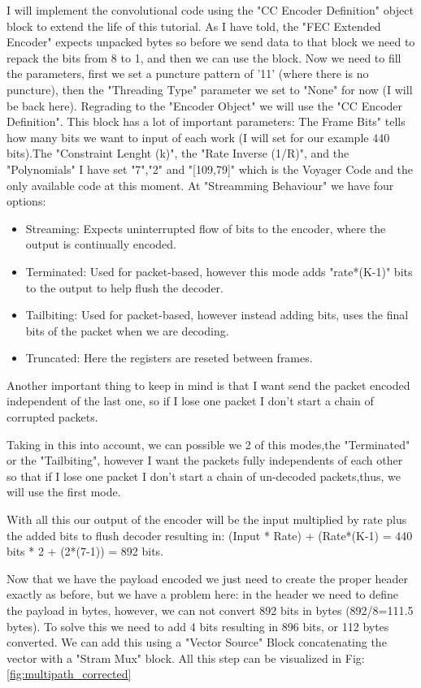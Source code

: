 \documentclass[a4paper, 10pt, conference]{ieeeconf}      %
\begin{document}
    I will implement the convolutional code using the "CC Encoder Definition" object block to extend the life of this tutorial. As I have told, the "FEC Extended Encoder" expects unpacked bytes so before we send data to that block we need to repack the bits from 8 to 1, and then we can use the block. Now we need to fill the parameters, first we set a puncture pattern of '11' (where there is no puncture), then the "Threading Type" parameter we set to "None" for now (I will be back here). Regrading to the "Encoder Object" we will use the "CC Encoder Definition". This block has a lot of important parameters: The Frame Bits" tells how many bits we want to input of each work (I will set for our example 440 bits).The "Constraint Lenght (k)", the "Rate Inverse (1/R)", and the "Polynomials" I have set "7","2" and "[109,79]" which is the Voyager Code and the only available code at this moment.
    At "Streamming Behaviour" we have four options:
    \begin{itemize}
        \item Streaming: Expects uninterrupted flow of bits to the encoder, where the output is continually encoded.
        \item Terminated: Used for packet-based, however this mode adds "rate*(K-1)" bits to the output to help flush the decoder.
        \item Tailbiting: Used for packet-based, however instead adding bits, uses the final bits of the packet when we are decoding.
        \item Truncated: Here the registers are reseted between frames.
    \end{itemize}
    Another important thing to keep in mind is that I want send the packet encoded independent of the last one, so if I lose one packet I don't start a chain of corrupted packets. 
    
    Taking in this into account, we can possible we 2 of this modes,the "Terminated" or the "Tailbiting", however I want the packets fully independents of each other so that if I lose one packet I don't start a chain of un-decoded packets,thus, we will use the first mode.
    
    With all this our output of the encoder will be the input multiplied by rate plus the added bits to flush decoder resulting in: (Input * Rate) + (Rate*(K-1) = 440 bits * 2 + (2*(7-1)) = 892 bits.
    
    Now that we have the payload encoded we just need to create the proper header exactly as before, but we have a problem here: in the header we need to define the payload in bytes, however, we can not convert 892 bits in bytes (892/8=111.5 bytes). To solve this we need to add 4 bits resulting in 896 bits, or 112 bytes converted. We can add this using a "Vector Source" Block concatenating the vector with a "Stram Mux" block. All this step can be visualized in Fig: \ref{fig:multipath_corrected}
    
\end{document}
